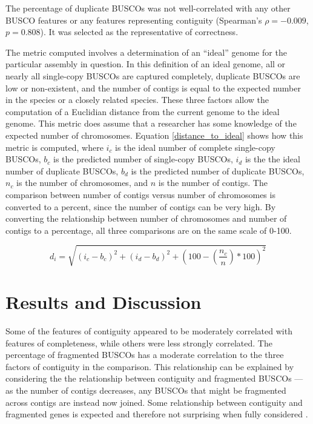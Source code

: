 \documentclass[twocolumn, dvipsnames]{bmcart}%
\begin{document}
The percentage of duplicate BUSCOs was not well-correlated with any other BUSCO features or any features representing contiguity (Spearman's $\rho = -0.009$, $p = 0.808$). It was selected as the representative of correctness.

The metric computed involves a determination of an ``ideal'' genome for the particular assembly in question. In this definition of an ideal genome, all or nearly all single-copy BUSCOs are captured completely, duplicate BUSCOs are low or non-existent, and the number of contigs is equal to the expected number in the species or a closely related species. These three factors allow the computation of a Euclidian distance from the current genome to the ideal genome. This metric does assume that a researcher has some knowledge of the expected number of chromosomes. Equation \ref{distance_to_ideal} shows how this metric is computed, where $i_c$ is the ideal number of complete single-copy BUSCOs, $b_c$ is the predicted number of single-copy BUSCOs, $i_d$ is the the ideal number of duplicate BUSCOs, $b_d$ is the predicted number of duplicate BUSCOs, $n_c$ is the number of chromosomes, and $n$ is the number of contigs. The comparison between number of contigs versus number of chromosomes is converted to a percent, since the number of contigs can be very high. By converting the relationship between number of chromosomes and number of contigs to a percentage, all three comparisons are on the same scale of 0-100.

\begin{equation}
\label{distance_to_ideal}
d_i = \sqrt{(i_c - b_c)^2 + (i_d-b_d)^2 + (100-(\frac{n_c}{n})*100)^2}
\end{equation}

\section*{Results and Discussion}

Some of the features of contiguity appeared to be moderately correlated with features of completeness, while others were less strongly correlated. The percentage of fragmented BUSCOs has a moderate correlation to the three factors of contiguity in the comparison. This relationship can be explained by considering the the relationship between contiguity and fragmented BUSCOs --- as the number of contigs decreases, any BUSCOs that might be fragmented across contigs are instead now joined. Some relationship between contiguity and fragmented genes is expected and therefore not surprising when fully considered \cite{grau_improving_2018}.
\end{document}
